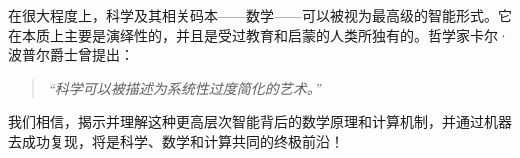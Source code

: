 \documentclass[../../book-main_zh.tex]{subfiles}
\begin{document}
在很大程度上，科学及其相关码本——数学——可以被视为最高级的智能形式。它在本质上主要是演绎性的，并且是受过教育和启蒙的人类所独有的。哲学家卡尔·波普尔爵士曾提出：
\begin{quote}
    \centering
    \textit{``科学可以被描述为系统性过度简化的艺术。''}
\end{quote}
我们相信，揭示并理解这种更高层次智能背后的数学原理和计算机制，并通过机器去成功复现，将是科学、数学和计算共同的终极前沿！
\end{document}
